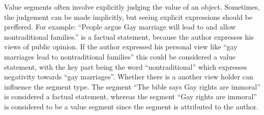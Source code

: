 Value segments often involve explicitly judging the value of an object.
Sometimes, the judgement can be made implicitly, but seeing explicit 
expressions should be preffered. For example: 
``People argue Gay marriage will lead to and allow
nontraditional families.'' is a factual statement, because 
the author expresses his views of public opinion. If the author expressed
his personal view like ``gay marriages lead to nontraditional families''
this could be considered a value statement, with the key part being
the word ``nontraditional'' which expresses negativity towards ``gay marriages''.
Whether there is a another view holder can influence the segment type. 
The segment ``The bible says Gay rights are immoral'' is considered a factual statement, 
whereas the segment ``Gay rights are immoral'' is considered to be a 
value segment since the segment is attributed to the author. 
